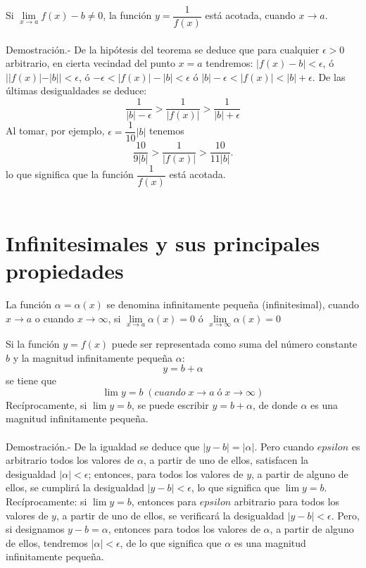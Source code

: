     \begin{teo}
	Si $\lim\limits_{x \to a} f(x) - b \neq 0$, la función $y=\dfrac{1}{f(x)}$ está acotada, cuando ${x \to a}$.\\\\
	    Demostración.-\; De la hipótesis del teorema se deduce que para cualquier $\epsilon > 0$ arbitrario, en cierta vecindad del punto $x=a$ tendremos: $|f(x)-b|<\epsilon$, ó $||f(x)|-|b||<\epsilon$, ó $-\epsilon < |f(x)|-|b|< \epsilon$ ó $|b|-\epsilon < |f(x)| < |b|+\epsilon.$ De las últimas desigualdades se deduce: $$\dfrac{1}{|b|-\epsilon}>\dfrac{1}{|f(x)|}>\dfrac{1}{|b|+\epsilon}$$
	    Al tomar, por ejemplo, $\epsilon = \dfrac{1}{10} |b|$ tenemos $$\dfrac{10}{9|b|}>\dfrac{1}{|f(x)|}>\dfrac{10}{11|b|}.$$
	    lo que significa que la función $\dfrac{1}{f(x)}$ está acotada.\\\\
    \end{teo}

\section{Infinitesimales y sus principales propiedades}

\begin{tcolorbox}[colframe=white]
    \begin{def.}
	La función $\alpha = \alpha(x)$ se denomina infinitamente pequeña (infinitesimal), cuando ${x \to a}$ o cuando ${x \to \infty}$, si $\lim\limits_{x \to a} \alpha(x) = 0$ ó $\lim\limits_{x \to \infty} \alpha(x)=0$
    \end{def.}
\end{tcolorbox}

    \begin{teo}
	Si la función $y=f(x)$ puede ser representada como suma del número constante $b$ y la magnitud infinitamente pequeña $\alpha$: $$y=b+\alpha$$ se tiene que $$\lim y = b \;(cuando \; {x \to a} \; ó \; {x \to \infty})$$ Recíprocamente, si $\lim y = b$, se puede escribir $y=b+\alpha$, de donde $\alpha$ es una magnitud infinitamente pequeña.\\\\
	    Demostración.-\; De la igualdad se deduce que $|y-b|=|\alpha|$. Pero cuando $epsilon$ es arbitrario todos los valores de $\alpha$, a partir de uno de ellos, satisfacen la desigualdad $|\alpha|<\epsilon$; entonces, para todos los valores de $y$, a partir de alguno de ellos, se cumplirá la desigualdad $|y-b|<\epsilon$, lo que significa que $\lim y = b$.\\
	    Recíprocamente: si $\lim y=b$, entonces para $epsilon$ arbitrario para todos los valores de $y$, a partir de uno de ellos, se verificará la desigualdad $|y-b|<\epsilon$. Pero, si designamos $y-b=\alpha$, entonces para todos los valores de $\alpha$, a partir de alguno de ellos, tendremos $|\alpha|<\epsilon$, de lo que significa que $\alpha$ es una magnitud infinitamente pequeña.\\\\
    \end{teo}

